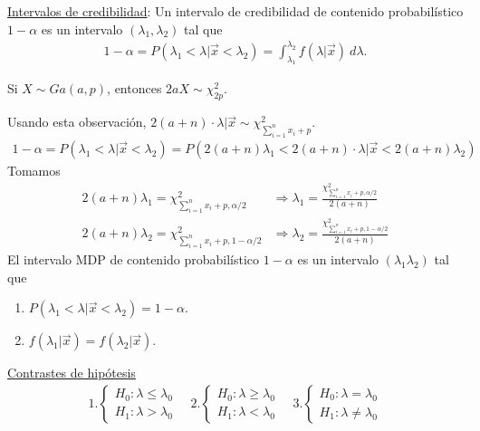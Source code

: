 \underline{Intervalos de credibilidad}: Un intervalo de credibilidad de contenido probabilístico $1-\alpha$ es un intervalo $(\lambda_1,\lambda_2)$ tal que
\begin{align*}
    1 - \alpha = P(\lambda_1 < \lambda | \vec{x} < \lambda_2) = \int_{\lambda_1}^{\lambda_2} f(\lambda | \vec{x}) \ d\lambda.
\end{align*}
\begin{obs}
    Si $X \sim Ga(a,p)$, entonces $2aX \sim \chi^2_{2p}$.
\end{obs}
Usando esta observación, $2(a+n) \cdot \lambda | \vec{x} \sim \chi^2_{\sum_{i=1}^{n} x_i + p }$.
\begin{align*}
    1 - \alpha = P(\lambda_1 < \lambda | \vec{x} < \lambda_2) = P(2(a+n)\lambda_1 < 2(a+n) \cdot\lambda | \vec{x} < 2(a+n) \lambda_2)
\end{align*}
Tomamos
\begin{align*}
    2(a+n)\lambda_1 = \chi^2_{\sum_{i=1}^{n} x_i + p, \alpha/2 }    & \Longrightarrow \lambda_1 = \frac{\chi^2_{\sum_{i=1}^{n} x_i + p, \alpha/2 }}{2(a+n)}    \\
    2(a+n)\lambda_2 = \chi^2_{\sum_{i=1}^{n} x_i + p, 1- \alpha/2 } & \Longrightarrow \lambda_2 = \frac{\chi^2_{\sum_{i=1}^{n} x_i + p, 1- \alpha/2 }}{2(a+n)}
\end{align*}
El intervalo MDP de contenido probabilístico $1-\alpha$ es un intervalo $(\lambda_1\lambda_2)$ tal que
\begin{enumerate}
    \item $P(\lambda_1 < \lambda| \vec{x} < \lambda_2) = 1 - \alpha$.
    \item $f(\lambda_1 | \vec{x}) = f(\lambda_2 | \vec{x})$.
\end{enumerate}
\underline{Contrastes de hipótesis}
\begin{align*}
    1. \begin{cases}
           H_0 : \lambda \leq \lambda_0 \\
           H_1 : \lambda > \lambda_0
       \end{cases} \quad     2.\begin{cases}
                                   H_0 : \lambda \ge \lambda_0 \\
                                   H_1 : \lambda < \lambda_0
                               \end{cases} \quad     3.\begin{cases}
                                                           H_0 : \lambda = \lambda_0 \\
                                                           H_1 : \lambda \not = \lambda_0
                                                       \end{cases}
\end{align*}

